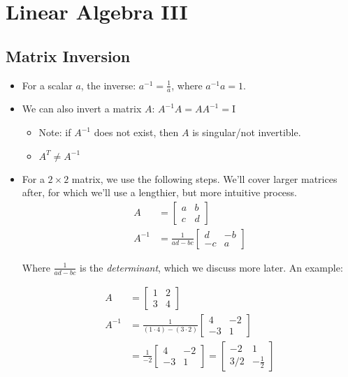 \section{Linear Algebra III}

\subsection{Matrix Inversion}

\begin{itemize}
    \item For a scalar $a$, the inverse: $a^{-1} = \frac{1}{a}$, where $a^{-1}a = 1$.
    \item We can also invert a matrix $A$: $A^{-1}A = AA^{-1} = \text{I}$
    \begin{itemize}
        \item Note: if $A^{-1}$ does not exist, then $A$ is singular/not invertible.
        \item $A^T \neq A^{-1}$
    \end{itemize}
    \item For a $2 \times 2$ matrix, we use the following steps. We'll cover larger matrices after, for which we'll use a lengthier, but more intuitive process.
    \begin{align*}
        A & = \begin{bmatrix}
            a & b \\
            c & d 
        \end{bmatrix} \\
        A^{-1} & = \frac{1}{ad - bc} 
        \begin{bmatrix}
            d & -b \\
            -c & a 
        \end{bmatrix}
    \end{align*}

    Where $\frac{1}{ad - bc}$ is the \emph{determinant}, which we discuss more later. An example:

    \begin{align*}
        A & = \begin{bmatrix}
            1 & 2 \\
            3 & 4 
        \end{bmatrix} \\
        A^{-1} & = \frac{1}{(1\cdot4) - (3 \cdot 2)} 
        \begin{bmatrix}
            4 & -2 \\
            -3 & 1 
        \end{bmatrix} \\
        & = \frac{1}{-2} 
        \begin{bmatrix}
            4 & -2 \\
            -3 & 1
        \end{bmatrix} = 
        \begin{bmatrix}
            -2 & 1 \\
            3/2 & -\frac{1}{2}
        \end{bmatrix}
    \end{align*}
    

\end{itemize}
